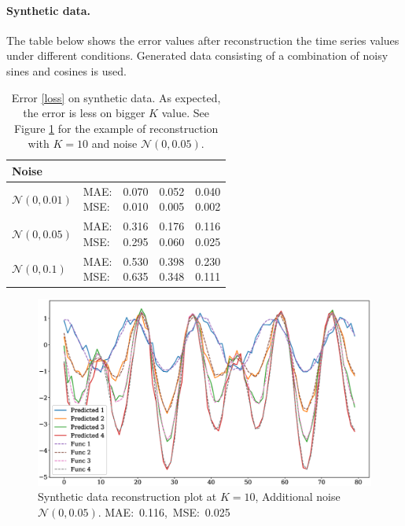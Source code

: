 \documentclass[12pt]{article}
\begin{document}
{\paragraph{Synthetic data.} The table below shows the error values after reconstruction the time series values under different conditions. Generated data consisting of a combination of noisy sines and cosines is used.

\begin{table}[!h]
\def\arraystretch{2.3}
\begin{center}
\caption{Error \eqref{loss} on synthetic data. As expected, the error is less on bigger $K$ value. See Figure \ref{fig:fig5} for the example of reconstruction with $K=10$ and noise $\mathcal{N}(0, 0.05)$.}
\begin{tabular}{|l||l||*{3}{c|}}\hline
	{Noise}
	&\makebox[3em]{Metric}&\makebox[3em]{$K=2$}&\makebox[3em]{$K=4$}&\makebox[3em]{$K=10$}\\\hline
	$\mathcal{N}(0, 0.01)$&\makecell{ MAE: \\ MSE: } &\makecell{ 0.070 \\ 0.010 }&\makecell{ 0.052 \\ 0.005 }&\makecell{ 0.040 \\ 0.002 }\\\hline
	$\mathcal{N}(0, 0.05)$&\makecell{ MAE: \\ MSE: } &\makecell{ 0.316 \\ 0.295 }&\makecell{ 0.176 \\ 0.060 }&\makecell{ 0.116 \\ 0.025 }\\\hline
	$\mathcal{N}(0, 0.1)$& \makecell{ MAE: \\ MSE: } &\makecell{ 0.530 \\ 0.635 }&\makecell{ 0.398 \\ 0.348 }&\makecell{ 0.230 \\ 0.111 }\\\hline
\end{tabular}
\end{center}
\end{table}


\begin{figure}[!htbp]
	\centering
	\includegraphics[width=\textwidth]{synthetic_time_series_K10N005.eps}
	\caption{Synthetic data reconstruction plot at $K=10$, Additional noise $\mathcal{N}(0, 0.05)$. \mbox{MAE: 0.116, MSE: 0.025}}
	\label{fig:fig5}
\end{figure}

}
\end{document}
